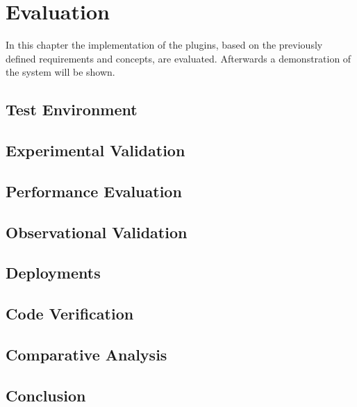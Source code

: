\chapter{Evaluation}\label{chapter:evaluation}
In this chapter the implementation of the plugins, based on the previously defined requirements and concepts, are evaluated.
Afterwards a demonstration of the system will be shown.

\section{Test Environment}
\doit

\section{Experimental Validation}
\doit

\section{Performance Evaluation}
\doit

\section{Observational Validation}
\doit

\section{Deployments}
\doit

\section{Code Verification}
\doit

\section{Comparative Analysis}
\doit

\section{Conclusion}
\doit
